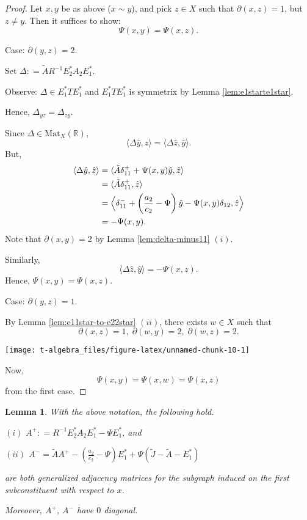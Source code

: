 \documentclass[
]{book}
\newtheorem{lemma}{Lemma}[chapter]
\theoremstyle{definition}
\theoremstyle{definition}
\theoremstyle{definition}
\theoremstyle{definition}
\theoremstyle{remark}
\begin{document}
\begin{proof}
Let \(x,y\) be as above (\(x\sim y\)), and pick \(z\in X\) such that \(\partial(x,z) = 1\), but \(z\neq y\). Then it suffices to show:
\[\Psi(x,y) = \Psi(x,z).\]

Case: \(\partial(y,z) = 2\).

Set \(\Delta: = \tilde{A}R^{-1}E^*_2A_2E^*_1\).

Observe: \(\Delta \in E^*_1TE^*_1\) and \(E^*_1TE^*_1\) is symmetrix by Lemma \ref{lem:e1starte1star}.

Hence, \(\Delta_{yz} = \Delta_{zy}\).

Since \(\Delta\in \mathrm{Mat}_X(\mathbb{R})\),
\[\langle \Delta\hat{y}, \hat{z}\rangle = \langle \Delta \hat{z}, \hat{y}\rangle.\]
But,
\begin{align}
\langle \Delta\hat{y}, \hat{z}\rangle & = \langle \tilde{A}\delta^+_{11} + \Psi(x,y)\hat{y}, \hat{z}\rangle \\
& = \langle \tilde{A}\delta^+_{11}, \hat{z}\rangle\\
& = \Bigl\langle \delta^-_{11} + \left(\frac{a_2}{c_2}-\Psi\right)\hat{y} - \Psi(x,y)\delta_{12}, \hat{z}\Bigr\rangle\\
& = -\Psi(x,y).
\end{align}
Note that \(\partial(x,y) = 2\) by Lemma \ref{lem:delta-minus11} \((i)\).

Similarly,
\[\langle\Delta\hat{z}, \hat{y}\rangle = -\Psi(x,z).\]
Hence, \(\Psi(x,y) = \Psi(x,z)\).

Case: \(\partial(y,z) = 1\).

By Lemma \ref{lem:e11star-to-e22star} \((ii)\), there exists \(w\in X\) such that
\[\partial(x,z) = 1, \; \partial(w,y)=2, \; \partial(w,z)=2.\]

\begin{center}\texttt{[image: t-algebra\_files/figure-latex/unnamed-chunk-10-1]} \end{center}

Now,
\[\Psi(x,y) = \Psi(x,w) = \Psi(x,z)\]
from the first case.
\end{proof}

\begin{lemma}
\protect\hypertarget{lem:aplus-aminus}{}\label{lem:aplus-aminus}With the above notation, the following hold.

\((i)\) \(A^+: = R^{-1}E^*_2A_2E^*_1 - \Psi E^*_1\), and

\((ii)\) \(A^- = \tilde{A}A^+ - \left(\frac{a_2}{c_2}-\Psi\right)E^*_1 + \Psi(\tilde{J} - \tilde{A} - E^*_1)\)

are both generalized adjacency matrices for the subgraph induced on the first subconstituent with respect to \(x\).

Moreover, \(A^+\), \(A^-\) have \(0\) diagonal.
\end{lemma}
\end{document}

